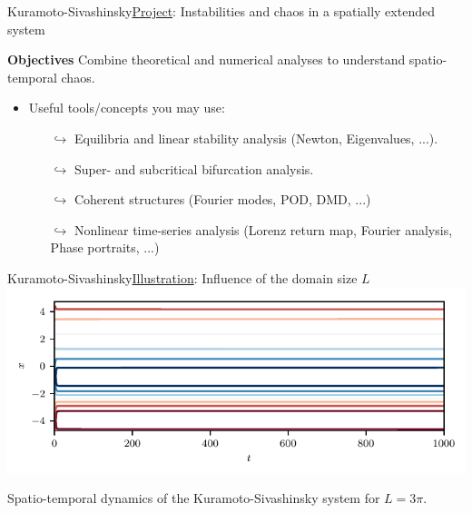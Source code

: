 \documentclass[usenames,dvipsnames,svgnames,10pt,aspectratio=169]{beamer}
\begin{document}
\begin{frame}[t, c]{Kuramoto-Sivashinsky}{\underline{Project}: Instabilities and chaos in a spatially extended system}

	\begin{block}{\centering \textbf{Objectives}}
		\centering
		Combine theoretical and numerical analyses to understand spatio-temporal chaos.
	\end{block}

	\bigskip

	\begin{itemize}
		\item Useful tools/concepts you may use:
		\begin{itemize}
			\item[$\hookrightarrow$] Equilibria and linear stability analysis (Newton, Eigenvalues, ...).
			\item[$\hookrightarrow$] Super- and subcritical bifurcation analysis.
			\item[$\hookrightarrow$] Coherent structures (Fourier modes, POD, DMD, ...)
			\item[$\hookrightarrow$] Nonlinear time-series analysis (Lorenz return map, Fourier analysis, Phase portraits, ...)
		\end{itemize}
	\end{itemize}

	\vspace{1cm}
\end{frame}

\begin{frame}[t, c]{Kuramoto-Sivashinsky}{\underline{Illustration}: Influence of the domain size $L$}
	\centering
	\includegraphics[width=.75\textwidth]{kuramoto_sivashinsky_small_domain}

	Spatio-temporal dynamics of the Kuramoto-Sivashinsky system for $L = 3 \pi$.

	\vspace{1cm}
\end{frame}
\end{document}
